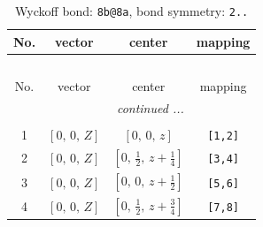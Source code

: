 \documentclass[fleqn,8pt]{jsarticle}
\begin{document}
\begin{longtable}{cccc}
\caption{Wyckoff bond: {\tt 8b@8a}, bond symmetry: {\tt 2..}}
 \\
 \hline \hline
No. & vector & center & mapping \\ \hline \endfirsthead

\multicolumn{3}{l}{\tablename\ \thetable{}} \\
 \hline \hline
No. & vector & center & mapping \\ \hline \endhead

 \hline \hline
\multicolumn{3}{r}{\footnotesize\it continued ...} \\ \endfoot

 \hline \hline
\multicolumn{3}{r}{} \\ \endlastfoot

1 & $\left[ 0,\, 0,\, Z \right]$ & $\left[ 0,\, 0,\, z \right]$ & {\tt [1,2]} \\ \hline
2 & $\left[ 0,\, 0,\, Z \right]$ & $\left[ 0,\, \frac{1}{2},\, z + \frac{1}{4} \right]$ & {\tt [3,4]} \\ \hline
3 & $\left[ 0,\, 0,\, Z \right]$ & $\left[ 0,\, 0,\, z + \frac{1}{2} \right]$ & {\tt [5,6]} \\ \hline
4 & $\left[ 0,\, 0,\, Z \right]$ & $\left[ 0,\, \frac{1}{2},\, z + \frac{3}{4} \right]$ & {\tt [7,8]} \\
\end{longtable}
\renewcommand{\arraystretch}{1.2}
\end{document}
